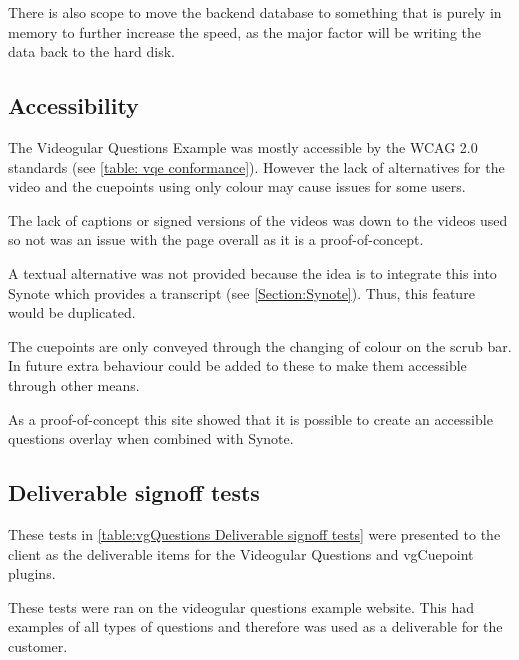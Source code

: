 There is also scope to move the backend database to something that is purely in memory to further increase the speed, as the major factor will be writing the data back to the hard disk.

\subsection{Accessibility}
\label{Subsection: vqe accessibility}

The \gls{Videogular} Questions Example was mostly accessible by the WCAG 2.0 standards (see \autoref{table: vqe conformance}). However the lack of alternatives for the video and the cuepoints using only colour may cause issues for some users.

The lack of captions or signed versions of the videos was down to the videos used so not was an issue with the page overall as it is a proof-of-concept.

A textual alternative was not provided because the idea is to integrate this into Synote which provides a transcript (see \autoref{Section:Synote}). Thus, this feature would be duplicated.

The cuepoints are only conveyed through the changing of colour on the scrub bar. In future extra behaviour could be added to these to make them accessible through other means.

As a proof-of-concept this site showed that it is possible to create an accessible questions overlay when combined with Synote.

\subsection{Deliverable signoff tests}

These tests in \autoref{table:vgQuestions Deliverable signoff tests} were presented to the client as the deliverable items for the Videogular Questions and vgCuepoint plugins.

These tests were ran on the videogular questions example website. This had examples of all types of questions and therefore was used as a deliverable for the customer.

